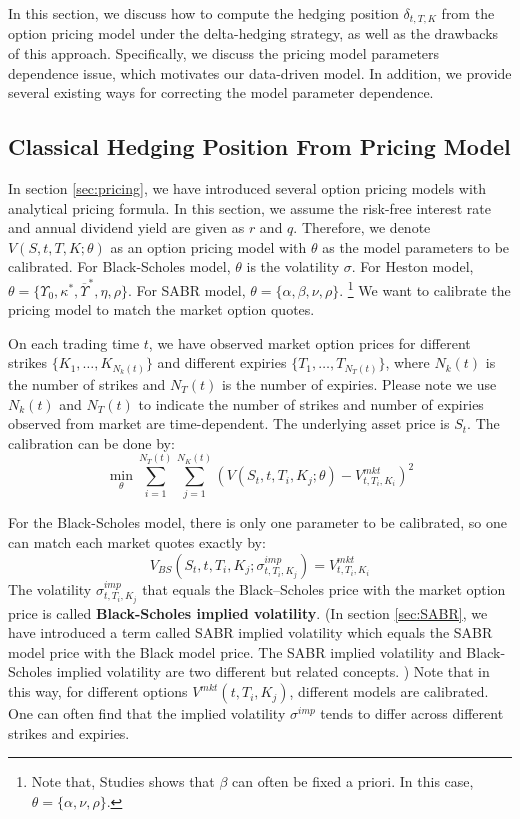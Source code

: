 \documentclass[letterpaper,12pt,titlepage,oneside,final]{book}
\numberwithin{equation}{section}
\theoremstyle{definition}
\newcommand{\Vmkt}{V^{mkt}}
\begin{document}
 In this section, we discuss how to compute the hedging position $\delta_{t,T,K}$ from the option pricing model under the delta-hedging strategy, as well as the drawbacks of this approach.  Specifically, we discuss the pricing model parameters dependence issue, which motivates our data-driven model. In addition, we provide several existing ways for correcting the model parameter dependence. 


\subsection{Classical Hedging Position From Pricing Model}
\label{sec:Classical}
In section \ref{sec:pricing}, we have introduced several option pricing models with analytical pricing formula. In this section, we assume the risk-free interest rate and annual dividend yield are given as $r$ and $q$. Therefore, we denote  $V(S,t,T,K;\theta)$  as an option pricing model with $\theta$ as the model parameters to be calibrated. For Black-Scholes model,  $\theta$ is the volatility $\sigma$. For Heston model, $\theta=\{\Upsilon_0,\kappa^*,\overline{\Upsilon}^*,\eta,\rho \}$. For SABR model, $\theta=\{\alpha,\beta,\nu,\rho \}$. \footnote{Note that, Studies \cite{hulloptimal,hagan2002managing,hagan2017bartlett} shows that $\beta$ can often be fixed a priori. In this case, $\theta=\{\alpha,\nu,\rho \}$.}
We want to calibrate the pricing model to match the market option quotes. 



On each trading time $t$, we have observed market option prices for different strikes $\{K_1,\dots, K_{N_k(t)}\}$ and different expiries $\{T_1,\dots, T_{N_T(t)}\}$, where $N_k(t)$ is the number of strikes and $N_T(t)$ is the number of expiries.
Please note we use  $N_k(t)$ and $N_T(t)$ to indicate the number of strikes and number of expiries observed from market are time-dependent.
The underlying asset price is $S_t$. The calibration can be done by:
\[
\min_{\theta}   \sum_{i=1}^{N_T(t)}  \sum_{j=1}^{N_K(t)} \left(V(S_t,t,T_i,K_j;\theta)-\Vmkt_{t,T_i,K_i}\right)^2
\]


For the Black-Scholes model, there is only one parameter to be calibrated,
so  one can match each market quotes exactly by:
\[
V_{BS}(S_t,t,T_i,K_j;\sigma^{imp}_{t,T_i,K_j})=\Vmkt_{t,T_i,K_i}
\]
The volatility $\sigma^{imp}_{t,T_i,K_j}$ that equals the Black–Scholes price with the market option price is called \textbf{Black-Scholes implied volatility}. (In section \ref{sec:SABR}, we have introduced a term called SABR implied volatility which equals the SABR model price with the Black model price. The SABR implied volatility and  Black-Scholes implied volatility are two different but related concepts. )
Note that in this way, for different options $\Vmkt(t,T_i,K_j)$, different models are calibrated.  One can often find that the implied volatility $\sigma^{imp}$ tends to differ across different strikes and expiries.
\end{document}
